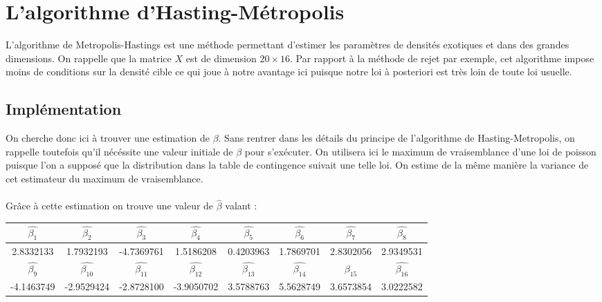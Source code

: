 \documentclass[french,12pt]{report}
\newcommand{\<}{\langle}
\renewcommand{\>}{\rangle}
\theoremstyle{definition}
\begin{document}





\chapter{L'algorithme d'Hasting-Métropolis}

L'algorithme de Metropolis-Hastings est une méthode permettant d'estimer les paramètres de densités exotiques et dans des grandes dimensions. On rappelle que la matrice $X$ est de dimension $20 \times 16$. Par rapport à la méthode de rejet par exemple, cet algorithme impose moins de conditions sur la densité cible ce qui joue à notre avantage ici puisque notre loi à posteriori est très loin de toute loi usuelle. 


\section{Implémentation}



On cherche donc ici à trouver une estimation de $\beta$.
Sans rentrer dans les détails du principe de l'algorithme de Hasting-Metropolis, on rappelle toutefois qu'il nécéssite une valeur initiale de $\beta$ pour s'exécuter. On utilisera ici le maximum de vraisemblance d'une loi de poisson puisque l'on a supposé que la distribution dans la table de contingence suivait une telle loi. On estime de la même manière la variance de cet estimateur du maximum de vraisemblance. \\
\\

Grâce à cette estimation on trouve une valeur de $\hat{\beta}$ valant : 

\begin{center}
\begin{tabular}{|c|c|c|c|c|c|c|c|}
\hline
$\hat{\beta_1}$ & $\hat{\beta_2}$ & $\hat{\beta_3}$ & $\hat{\beta_4}$ & $\hat{\beta_5}$ & $\hat{\beta_6}$ & $\hat{\beta_7}$ & $\hat{\beta_8}$\\ \hline
2.8332133 & 1.7932193 & -4.7369761 & 1.5186208 & 0.4203963 
& 1.7869701 & 2.8302056 & 2.9349531\\\hline
$\hat{\beta_9}$ & $\hat{\beta_{10}}$ & $\hat{\beta_{11}}$ & $\hat{\beta_{12}}$ & $\hat{\beta_{13}}$ & $\hat{\beta_{14}}$ & $\hat{\beta_{15}}$ & $\hat{\beta_{16}}$\\\hline
 -4.1463749 & -2.9529424 & -2.8728100 & -3.9050702 & 3.5788763 &  5.5628749 &  3.6573854 & 3.0222582\\ \hline
\end{tabular}
\end{center}
\end{document}

